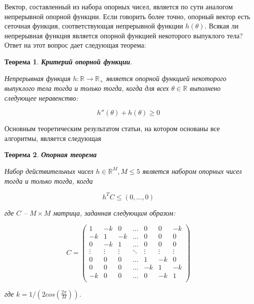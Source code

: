 \documentclass[a4paper, 12pt, titlepage]{article}
\theoremstyle{definition}
\theoremstyle{plain}
\newtheorem{SmartTheorem}{Теорема}
\theoremstyle{plain}
\begin{document}
Вектор, составленный из набора опорных чисел, является по сути аналогом
непрерывной опорной функции. Если говорить более точно, опорный вектор есть
сеточная функция, соответствующая непрерывной функции $h(\theta)$. Всякая ли
непрерывная функция является опорной функцией некоторого выпуклого тела? Ответ
на этот вопрос дает следующая теорема:

\begin{SmartTheorem}
 \label{thm:support-function-criterion}
 \textbf{Критерий опорной функции}.

 Непрерывная функция $h : \mathbb{R} \to \mathbb{R}_{+}$ является опорной
 функцией некоторого выпуклого тела тогда и только тогда, когда для всех
 $\theta \in \mathbb{R}$ выполнено следующее неравенство:

 \begin{equation}
 h''(\theta) + h(\theta) \geq 0
 \end{equation}
\end{SmartTheorem}


Основным теоретическим результатом статьи, на котором основаны все алгоритмы,
является следующая

\begin{SmartTheorem}
 \label{thm:support-vector-criterion}
 \textbf{Опорная теорема}

 Набор действительных чисел $h \in \mathbb{R}^{M}, M \leq 5$ является набором
 опорных чисел тогда и только тогда, когда

 \begin{equation}
  h^{T} C \leq (0, \ldots, 0)
 \end{equation}

 где $C$ -- $M \times M$ матрица, заданная следующим образом:

 \begin{equation}
  C =
  \left(
  \begin{array}{ccccccc}
       1 &     -k &      0 & \ldots &      0 &      0 &     -k \\
      -k &      1 &     -k & \ldots &      0 &      0 &      0 \\
       0 &     -k &      1 & \ldots &      0 &      0 &      0 \\
  \vdots & \vdots & \vdots & \ddots & \vdots & \vdots & \vdots \\
       0 &      0 &      0 & \ldots &      1 &     -k &      0 \\
       0 &      0 &      0 & \ldots &     -k &      1 &     -k \\
      -k &      0 &      0 & \ldots &      0 &     -k &      1 \\
  \end{array}
  \right)
 \end{equation}

 где $k = 1 / (2 cos(\frac{2 \pi}{M}))$.
\end{SmartTheorem}
\end{document}
